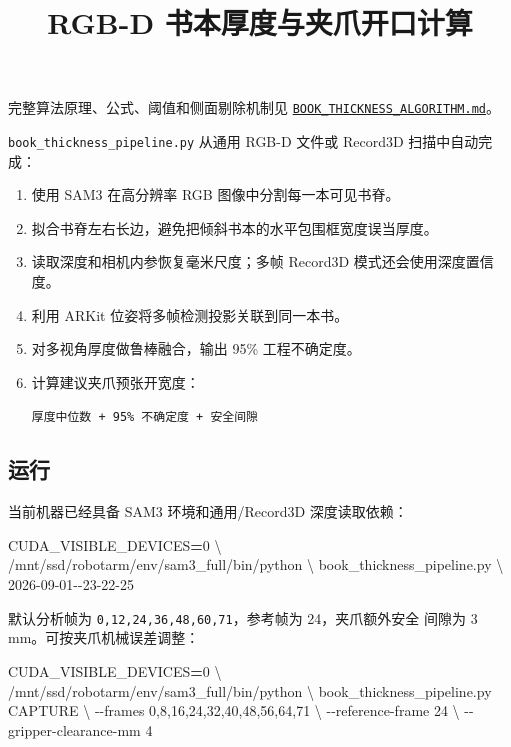\documentclass[
  chinese,
  11pt,
  a4paper,
]{article}
\title{RGB-D 书本厚度与夹爪开口计算}
\author{}
\date{}
\newenvironment{Shaded}{\begin{snugshade}}{\end{snugshade}}
\newcommand{\AttributeTok}[1]{\textcolor[rgb]{0.13,0.29,0.53}{#1}}
\newcommand{\DataTypeTok}[1]{\textcolor[rgb]{0.13,0.29,0.53}{#1}}
\newcommand{\ExtensionTok}[1]{#1}
\newcommand{\NormalTok}[1]{#1}
\newcommand{\OperatorTok}[1]{\textcolor[rgb]{0.81,0.36,0.00}{\textbf{#1}}}
\newcommand{\VariableTok}[1]{\textcolor[rgb]{0.00,0.00,0.00}{#1}}
\begin{document}
\maketitle

\renewcommand*\contentsname{目录}
{
\setcounter{tocdepth}{3}
\tableofcontents
}
完整算法原理、公式、阈值和侧面剔除机制见
\href{BOOK_THICKNESS_ALGORITHM.md}{\texttt{BOOK\_THICKNESS\_ALGORITHM.md}}。

\texttt{book\_thickness\_pipeline.py} 从通用 RGB-D 文件或 Record3D
扫描中自动完成：

\begin{enumerate}
\def\labelenumi{\arabic{enumi}.}
\item
  使用 SAM3 在高分辨率 RGB 图像中分割每一本可见书脊。
\item
  拟合书脊左右长边，避免把倾斜书本的水平包围框宽度误当厚度。
\item
  读取深度和相机内参恢复毫米尺度；多帧 Record3D 模式还会使用深度置信度。
\item
  利用 ARKit 位姿将多帧检测投影关联到同一本书。
\item
  对多视角厚度做鲁棒融合，输出 95\% 工程不确定度。
\item
  计算建议夹爪预张开宽度：

  \texttt{厚度中位数\ +\ 95\%\ 不确定度\ +\ 安全间隙}
\end{enumerate}

\subsection{运行}\label{ux8fd0ux884c}

当前机器已经具备 SAM3 环境和通用/Record3D 深度读取依赖：

\begin{Shaded}
\begin{Highlighting}[]
\VariableTok{CUDA\_VISIBLE\_DEVICES}\OperatorTok{=}\NormalTok{0 }\DataTypeTok{\textbackslash{}}
\ExtensionTok{/mnt/ssd/robotarm/env/sam3\_full/bin/python} \DataTypeTok{\textbackslash{}}
\NormalTok{book\_thickness\_pipeline.py }\DataTypeTok{\textbackslash{}}
\NormalTok{2026{-}09{-}01{-}{-}23{-}22{-}25}
\end{Highlighting}
\end{Shaded}

默认分析帧为 \texttt{0,12,24,36,48,60,71}，参考帧为 24，夹爪额外安全
间隙为 3 mm。可按夹爪机械误差调整：

\begin{Shaded}
\begin{Highlighting}[]
\VariableTok{CUDA\_VISIBLE\_DEVICES}\OperatorTok{=}\NormalTok{0 }\DataTypeTok{\textbackslash{}}
\ExtensionTok{/mnt/ssd/robotarm/env/sam3\_full/bin/python} \DataTypeTok{\textbackslash{}}
\NormalTok{book\_thickness\_pipeline.py CAPTURE }\DataTypeTok{\textbackslash{}}
  \AttributeTok{{-}{-}frames}\NormalTok{ 0,8,16,24,32,40,48,56,64,71 }\DataTypeTok{\textbackslash{}}
  \AttributeTok{{-}{-}reference{-}frame}\NormalTok{ 24 }\DataTypeTok{\textbackslash{}}
  \AttributeTok{{-}{-}gripper{-}clearance{-}mm}\NormalTok{ 4}
\end{Highlighting}
\end{Shaded}
\end{document}
